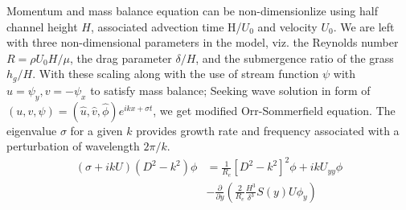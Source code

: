\documentclass[aps,prl,twocolumn,showpacs,superscriptaddress,groupedaddress,10pt]{revtex4-1}  %
\newcommand{\grad}{\mathbf{\nabla}}
\newcommand{\del}{\partial}
\begin{document}
Momentum and mass balance equation can be non-dimensionlize using half channel height $H$, associated advection time H/$U_0$ and velocity $U_0$. 
We are left with three non-dimensional parameters in the model, viz. the Reynolds number $R= {\rho U_0 H}/{\mu}$, the drag parameter $\delta/H$, 
and the submergence ratio of the grass $h_g/H$. With these scaling along with the use of stream function $\psi$ with $u = \psi_{y}, v= -\psi_x$ to satisfy mass balance; 
Seeking wave solution in form of $\left(u,v,\psi \right)= \left(\hat u, \hat v, \hat\phi \right)e^{ikx+\sigma t}$,  
we get modified Orr-Sommerfield equation. The eigenvalue $\sigma$ for a given $k$ provides growth rate and frequency associated with a perturbation of wavelength $2\pi/k$.
\begin{equation}
\begin{split}
\left(\sigma+ikU\right) \left(D^2-k^2\right)\phi &= \frac{1}{R_{e}}\left[D^2 -k^{2} \right]^2\phi +ikU_{yy}\phi \\
&-\frac{\del}{\del y}\left(\frac{2}{R_e}\frac{H^3}{\delta^3}S(y) U\phi_y\right)
\label{Orr-somerfield}
\end{split}
\end{equation}
\end{document}
